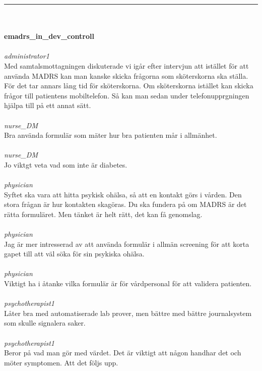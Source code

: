 \documentclass[12pt,a4paper,oneside]{article}
\begin{document}
\hrule
\ \\\ \\{\bf emadrs\_in\_dev\_controll }
\\\ \\%
 { \it administrator1 %
}\\ 
Med samtalsmottagningen diskuterade vi ig{\aa}r efter intervjun att ist{\"a}llet f{\"o}r att anv{\"a}nda MADRS  kan man kanske skicka fr{\aa}gorna som sk{\"o}terskorna ska st{\"a}lla. F{\"o}r det tar annars l{\aa}ng tid f{\"o}r sk{\"o}terskorna. Om sk{\"o}terskorna ist{\"a}llet kan skicka fr{\aa}gor till patientens mobiltelefon. S{\aa} kan man sedan under telefonupprgningen hj{\"a}lpa till p{\aa} ett annat s{\"a}tt.  %
\ \\\ \\
 { \it   nurse\_DM %
}\\ 
Bra anv{\"a}nda formul{\"a}r som m{\"a}ter hur bra patienten m{\aa}r i allm{\"a}nhet.  %
\ \\\ \\
 { \it   nurse\_DM %
}\\ 
Jo viktgt veta vad som inte {\"a}r diabetes. %
\ \\\ \\
 { \it   physician %
}\\ 
 Syftet ska vara att hitta psykisk oh{\"a}lsa, s{\aa} att en kontakt g{\"o}rs i v{\aa}rden. Den stora fr{\aa}gan {\"a}r hur kontakten skag{\"o}ras. Du ska fundera p{\aa} om MADRS {\"a}r det r{\"a}tta formul{\"a}ret. Men t{\"a}nket {\"a}r helt r{\"a}tt, det kan f{\aa} genomslag.  %
\ \\\ \\
 { \it   physician %
}\\ 
Jag {\"a}r mer intresserad av att anv{\"a}nda formul{\"a}r i allm{\"a}n screening f{\"o}r att korta gapet till att v{\"a}l s{\"o}ka f{\"o}r sin psykiska oh{\"a}lsa.  %
\ \\\ \\
 { \it   physician %
}\\ 
Viktigt ha i {\aa}tanke vilka formul{\"a}r {\"a}r f{\"o}r v{\aa}rdpersonal f{\"o}r att validera patienten. %
\ \\\ \\
 { \it   psychotherapist1 %
}\\ 
L{\aa}ter bra med automatiserade lab prover, men b{\"a}ttre med b{\"a}ttre journalsystem som skulle signalera saker. %
\ \\\ \\
 { \it   psychotherapist1 %
}\\ 
Beror p{\aa} vad man g{\"o}r med v{\"a}rdet. Det {\"a}r viktigt att n{\aa}gon handhar det och m{\"o}ter symptomen. Att det f{\"o}ljs upp. %
\end{document}
